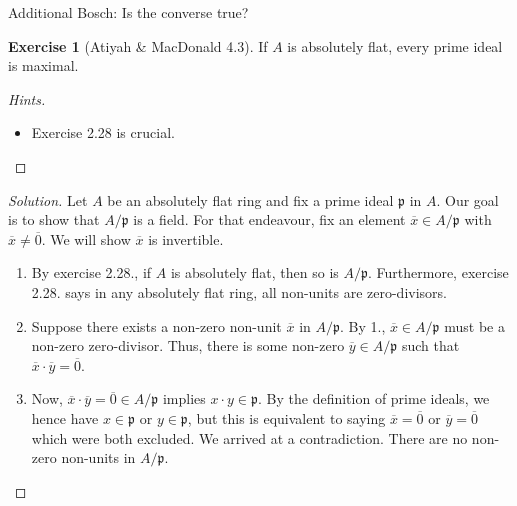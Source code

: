 \documentclass[a4paper]{book}
\theoremstyle{definition}
\newtheorem{exercise}{Exercise}[definition]
\begin{document}
Additional Bosch: Is the converse true?


\begin{exercise}[Atiyah \& MacDonald 4.3]
    If \(A\) is absolutely flat, every prime ideal is maximal.
\end{exercise}
\begin{proof}[Hints]
    \begin{itemize}
        \item Exercise 2.28 is crucial.
    \end{itemize}
\end{proof}
\begin{proof}[Solution]
    Let \(A\) be an absolutely flat ring and fix a prime ideal \(\mathfrak{p}\) in \(A\). Our goal is to show that \(A / \mathfrak{p}\) is a field. For that endeavour, fix an element \(\overline{x} \in A / \mathfrak{p}\) with \(\overline{x} \neq \overline{0}\). We will show \(\overline{x}\) is invertible.
    \begin{enumerate}
        \item By exercise 2.28., if \(A\) is absolutely flat, then so is \(A / \mathfrak{p}\). Furthermore, exercise 2.28. says in any absolutely flat ring, all non-units are zero-divisors.
        \item Suppose there exists a non-zero non-unit \(\overline{x}\) in \(A / \mathfrak{p}\). By 1., \(\overline{x} \in A / \mathfrak{p}\) must be a non-zero zero-divisor. Thus, there is some non-zero \(\overline{y} \in A / \mathfrak{p}\) such that \(\overline{x} \cdot \overline{y} = \overline{0}\).
        \item Now, \(\overline{x} \cdot \overline{y} = \overline{0} \in A / \mathfrak{p}\) implies \(x \cdot y \in \mathfrak{p}\). By the definition of prime ideals, we hence have \(x \in \mathfrak{p}\) or \(y \in \mathfrak{p}\), but this is equivalent to saying \(\overline{x} = \overline{0}\) or \(\overline{y} = \overline{0}\) which were both excluded. We arrived at a contradiction. There are no non-zero non-units in \(A / \mathfrak{p}\).
    \end{enumerate}
\end{proof}
\end{document}
